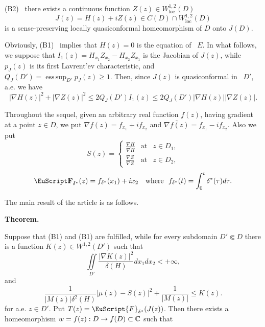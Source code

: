 \begin{summary}
\noindent(B2) \ there exists a continuous function $Z(z)\in W^{1,2}_{\mathrm{loc}}(D)$
$$
J(z)=H(z)+i  Z(z)\in C(D)\cap
W^{1,2}_{\mathrm{loc}}(D)
$$
is a sense-preserving locally quasiconformal homeomorphism of $D$ onto $J(D)$.


Obviously, (B1) \ implies that $H(z)=0$ is the equation of ~$ E$.
In what follows, we suppose that
$I_1(z)=H_{x_1}Z_{x_2}-H_{x_2}Z_{x_1}$ is the Jacobian of $J(z)$, while $p_{J}(z)$ is
its first Lavrent'ev characteristic, and $Q_J(D')=\mathop{\mathrm{ess\,sup}}_{D'}p_{J}(z)\geq1$.
Then, since $J(z)$ is quasiconformal
in ~$D'$, a.e. we have
\begin{equation}\nonumber
    |\nabla H(z)|^2+|\nabla
    Z(z)|^2\leq2Q_J(D')I_1(z)\leq2Q_J(D')|\nabla H(z)||\nabla Z(z)|.
\end{equation}

Throughout the sequel, given an arbitrary real function $f(z)$, having gradient at a point $z\in D$, we
put $\nabla f(z)=f_{x_1}+i f_{x_2}$ and $\overline{\nabla f(z)}=f_{x_1}-i f_{x_2}.$ Also we put
$$
S(z)=\left\lbrace\begin{array}{ccc}
  \frac{\nabla H}{\overline{\nabla H}} & \mbox{at} & z\in D_1, \\[15pt]
  \frac{\nabla Z}{\overline{\nabla Z}}& \mbox{at} &  z\in D_2,
\end{array}\right.
$$
\begin{equation}
\FF_{\delta^{*}}(z)=f_{\delta^{*}}(x_1)+i x_2 \ \ \ \mbox{where} \ \ f_{\delta^{*}}(t)=\int_0^t{\delta^{*}} (\tau)d\tau.
\nonumber
\end{equation}


The main result of the article is as follows.

\noindent\textbf{Theorem.} \begin{itshape}
Suppose that (B1) and (B1) are fulfilled, while for every subdomain $D'\Subset D$ there is
a function $K(z)\in W^{1,2}(D')$ such that
\begin{equation}
\iint\limits_{D'}\frac{
|\nabla
K(z)|^2}{\delta(H)}dx_1dx_2<+\infty,
\nonumber
\end{equation}
and
\begin{equation}
\nonumber
\frac{1}{|M(z)|\delta^2(H)}\left|\mu(z)-S(z)\right|^2+\frac{1}{|M(z)|}\leq K(z).
\end{equation}
for a.e. $z\in D'$.
Put $T(z)=\EuScript{F}_{\delta^{*}}(J(z))$. Then there exists a homeomorphism $w=f(z):D\to f(D)\subset{\Bbb C}$
such that


\end{itshape}
\end{summary}
